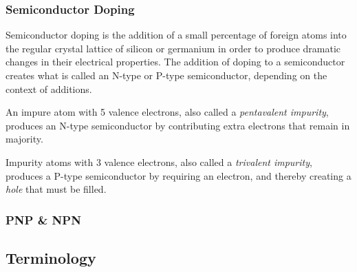 \documentclass[12pt]{article}
\begin{document}
\subsubsection{Semiconductor Doping}
Semiconductor doping is the addition of a small percentage of foreign atoms into the regular crystal lattice of silicon or germanium in order to produce dramatic changes in their electrical properties. The addition of doping to a semiconductor creates what is called an N-type or P-type semiconductor, depending on the context of additions.

An impure atom with 5 valence electrons, also called a \emph{pentavalent impurity}, produces an N-type semiconductor by contributing extra electrons that remain in majority.

Impurity atoms with 3 valence electrons, also called a \emph{trivalent impurity}, produces a P-type semiconductor by requiring an electron, and thereby creating a \emph{hole} that must be filled.
\subsubsection{PNP \& NPN}
\subsection{Terminology}
\end{document}
